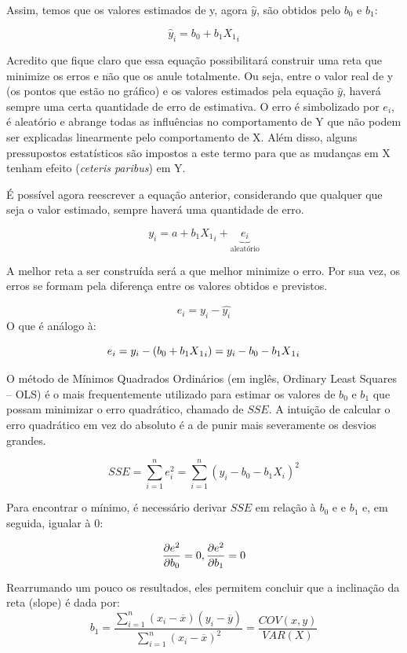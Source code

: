\documentclass[
]{book}
\begin{document}
Assim, temos que os valores estimados de y, agora \(\hat{y}\), são obtidos pelo \(b_0\) e \(b_1\):

\[\hat{y}_i = b_0 + b_1X{_1}_i\]

Acredito que fique claro que essa equação possibilitará construir uma reta que minimize os erros e não que os anule totalmente. Ou seja, entre o valor real de y (os pontos que estão no gráfico) e os valores estimados pela equação \(\hat{y}\), haverá sempre uma certa quantidade de erro de estimativa. O erro é simbolizado por \(e_i\), é aleatório e abrange todas as influências no comportamento de Y que não podem ser explicadas linearmente pelo comportamento de X. Além disso, alguns pressupostos estatísticos são impostos a este termo para que as mudanças em X tenham efeito (\emph{ceteris paribus}) em Y.

É possível agora reescrever a equação anterior, considerando que qualquer que seja o valor estimado, sempre haverá uma quantidade de erro.

\[y_i = a + b_1X{_1}_i+\underbrace{e_i}_\text{aleatório}\]

A melhor reta a ser construída será a que melhor minimize o erro. Por sua vez, os erros se formam pela diferença entre os valores obtidos e previstos.

\[e_i = y_i - \hat{y_i}\]
O que é análogo à:

\[e_i = y_i - (b_0 + b_1X{_1}_i) \\ =  y_i - b_0 - b_1X{_1}_i\]

O método de Mínimos Quadrados Ordinários (em inglês, Ordinary Least Squares -- OLS) é o mais frequentemente utilizado para estimar os valores de \(b_0\) e \(b_1\) que possam minimizar o erro quadrático, chamado de \(SSE\). A intuição de calcular o erro quadrático em vez do absoluto é a de punir mais severamente os desvios grandes.

\[SSE = \sum_{i=1}^n e_i^2 = \sum_{i=1}^n (y_i - b_0 - b_1 X_i)^2\]

Para encontrar o mínimo, é necessário derivar \(SSE\) em relação à \(b_0\) e e \(b_1\) e, em seguida, igualar à 0:

\[\frac{\partial e^2}{\partial b_0}  = 0,\\ \frac{\partial e^2}{\partial b_1} = 0\]

Rearrumando um pouco os resultados, eles permitem concluir que a inclinação da reta (slope) é dada por:
\[b_1=\frac{\sum\limits_{i=1}^{n} (x_i-\overline{x}) (y_i-\overline{y})}{\sum\limits_{i=1}^{n} (x_i-\overline{x})^2} = \frac{COV(x,y)}{VAR(X)}\]
\end{document}
